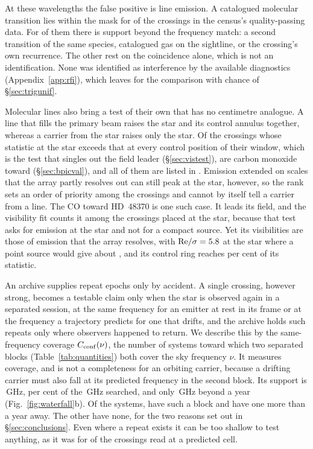 At these wavelengths the false positive is line emission. A
catalogued molecular transition lies within the mask for \CsNAttrQp{} of the
\CsNCrossQp{} crossings in the census's quality-passing data. For
\LnAttrSupp{} of them there is support beyond the frequency match: a second
transition of the same species, catalogued gas on the sightline, or the
crossing's own recurrence. The other \LnAttrCoincWord{} rest on the
coincidence alone, which is not an identification. None was identified as
interference by the available diagnostics (Appendix~\ref{app:rfi}), which
leaves \CsNUnattrQp{} for the comparison with chance of \S\ref{sec:trigunif}.

Molecular lines also bring a test of their own that has no centimetre
analogue. A line that fills the primary beam raises the star and its control
annulus together, whereas a carrier from the star raises only the star. Of the \LrStageN{}
crossings whose statistic at the star exceeds that at every control position
of their window, which is the test that singles out the field leader
(\S\ref{sec:vistest}), \LrStageNCo{} are carbon monoxide toward
\LrStageCoStars{} (\S\ref{sec:bpicval}), and all of them are listed in
\texttt{\LrStageFile}. Emission extended on scales that the array partly
resolves out can still peak at the star, however, so the rank sets an order
of priority among the crossings and cannot by itself tell a carrier from a
line. The CO toward HD~48370 is one such case. It leads its field, and the visibility fit counts it among the
crossings placed at the star, because that test asks for emission at the
star and not for a compact source. Yet its visibilities are those of
emission that the array resolves, with
${\rm Re}/\sigma=5.8$ at the star where a point source would give about
\JqHdRePoint, and its control ring reaches \JqHdCtrlPct{} per cent of its
statistic.

An archive supplies repeat epochs only by accident. A single crossing,
however strong, becomes a testable claim only when the star is observed
again in a separated session, at the same frequency for an emitter at rest in
its frame or at the frequency a trajectory predicts for one that drifts, and
the archive holds such repeats only where observers happened to return.
We describe this by the same-frequency coverage
$C_{\rm conf}(\nu)$, the number of systems toward which two separated blocks
(Table~\ref{tab:quantities}) both cover the sky frequency $\nu$. It measures
coverage, and is not a completeness for an orbiting carrier, because a
drifting carrier must also fall at its predicted frequency in the second
block. Its support is \CvConfGHzDay\,GHz, \CvConfPctDay{} per cent of the
\CvUnionA\,GHz searched, and only \CvConfGHzYr\,GHz beyond a year
(Fig.~\ref{fig:waterfall}b). Of the \NSysClassA{} systems, \ZcConfSysDay{}
have such a block and \ZcConfSysYr{} have one more than a year away. The
other \ZcNoRepSys{} have none, for the two reasons set out in
\S\ref{sec:conclusions}. Even where a repeat exists it can be
too shallow to test anything, as it was for \HjNPowerLo{} of the \RcNExcl{}
crossings read at a predicted cell.

